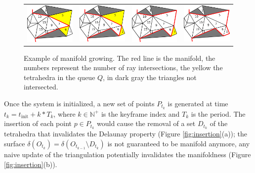 \begin{figure}[tp]
\begin{tabular}{cccc}
  \includegraphics[width=0.2\columnwidth]{./img/ch_soa/incrementalGrowing08}&
  \includegraphics[width=0.2\columnwidth]{./img/ch_soa/incrementalGrowing09}&
  \includegraphics[width=0.2\columnwidth]{./img/ch_soa/incrementalGrowing10}&
  \includegraphics[width=0.2\columnwidth]{./img/ch_soa/incrementalGrowing11}\\
 \end{tabular}
 \caption{Example of manifold growing. The red line is the manifold, the numbers represent the number of ray intersections, the yellow the tetrahedra in the queue $Q$, in dark gray the triangles not intersected.}
 \label{fig:growing}
\end{figure}






Once the system is initialized, a new set of points $P_{t_k}$ is generated at time $t_k= t_{\text{init}} + k*T_k$, where $k \in \mathbb{N^+}$ is the keyframe index and $T_k$ is the period. 
The insertion of each point $p\in P_{t_k}$ would cause the removal of a set $D_{t_k}$ of the tetrahedra that invalidates the Delaunay property (Figure \ref{fig:insertion}(a)); the surface $\delta (O_{t_k}) = \delta (O_{t_{k-1}} \setminus D_{t_k})$ is not guaranteed to be manifold anymore,  any  naive update of the triangulation potentially invalidates the manifoldness (Figure \ref{fig:insertion}(b)). 

